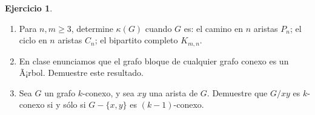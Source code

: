 \documentclass[12pt]{report}
\theoremstyle{plain}
\theoremstyle{definition}
\newtheorem{exercise}[theorem]{Ejercicio}
\begin{document}
\begin{exercise}

\begin{enumerate}

\item Para $n, m \ge 3$, determine $\kappa(G)$ cuando $G$ es: el camino en $n$ aristas $P_n$; el ciclo en $n$ aristas $C_n$; el bipartito completo $K_{m,n}$.

\item En clase enunciamos que el grafo bloque de cualquier grafo conexo es un Ã¡rbol. Demuestre este resultado.

\item Sea $G$ un grafo $k$-conexo, y sea $xy$ una arista de $G$. Demuestre que  $G/xy$ es $k$-conexo si y s\'olo si $G-\{x,y\}$ es $(k-1)$-conexo.


\end{enumerate}

\end{exercise}
\end{document}

